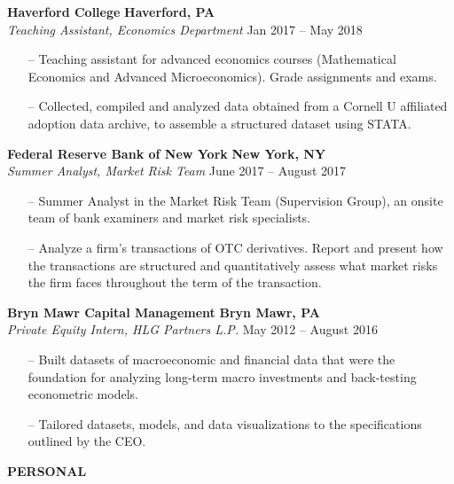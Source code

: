 \documentclass[paper=a4, fontsize=11pt]{scrartcl} %
\newcommand{\I}{--}
\newenvironment{mycenter}[1][\topsep]
  {\setlength{\topsep}{#1}\par\kern\topsep\centering}%
  {\par\kern\topsep}%
\begin{document}
\textbf{Haverford College} \hfill \textbf{Haverford, PA}\\
\textit{Teaching Assistant, Economics Department}
\hfill Jan 2017 -- May 2018
\begin{itemize}[topsep=0pt,noitemsep]
  \item[\I] Teaching assistant for advanced economics courses (Mathematical Economics and Advanced Microeconomics). Grade assignments and exams. 
  \item[\I] Collected, compiled and analyzed data obtained from a Cornell U affiliated adoption data
archive, to assemble a structured dataset using STATA.
\end{itemize}

\vspace{1mm}

\textbf{Federal Reserve Bank of New York} \hfill \textbf{New York, NY} \\
\textit{Summer Analyst, Market Risk Team} \hfill June 2017 -- August 2017
\begin{itemize}[topsep=0pt,noitemsep]
	\item[\I] Summer Analyst in the Market Risk Team (Supervision Group), an onsite team of bank examiners and
market risk specialists. 
	\item[\I] Analyze a firm's transactions of OTC derivatives. Report and present
how the transactions are structured and quantitatively assess what market risks the firm faces throughout the term of the
transaction.
\end{itemize}

\textbf{Bryn Mawr Capital Management} \hfill \textbf{Bryn Mawr, PA} \\
\textit{Private Equity Intern, HLG Partners L.P.} \hfill May 2012 -- August 2016
\begin{itemize}[topsep=0pt,noitemsep]
	\item[\I] Built datasets of macroeconomic and financial data that were the foundation for
analyzing long-term macro investments and back-testing econometric models.
	\item[\I] Tailored datasets, models, and data visualizations to the specifications outlined by the CEO.

\end{itemize}

\vspace{2mm}

\begin{mycenter}[0pt]
\textsc{\textbf{PERSONAL}}
\end{mycenter}
\end{document}
